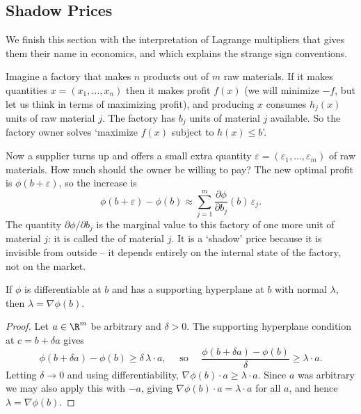 \subsection{Shadow Prices}

We finish this section with the interpretation of Lagrange multipliers that gives them their name in economics, and which explains the strange sign conventions.

Imagine a factory that makes $n$ products out of $m$ raw materials. If it makes quantities $x = (x_1, \dots, x_n)$ then it makes profit $f(x)$ (we will minimize $-f$, but let us think in terms of maximizing profit), and producing $x$ consumes $h_j(x)$ units of raw material $j$. The factory has $b_j$ units of material $j$ available. So the factory owner solves `maximize $f(x)$ subject to $h(x) \leq b$'.

Now a supplier turns up and offers a small extra quantity $\varepsilon = (\varepsilon_1, \dots, \varepsilon_m)$ of raw materials. How much should the owner be willing to pay? The new optimal profit is $\phi(b + \varepsilon)$, so the increase is
$$
\phi(b + \varepsilon) - \phi(b) \approx \sum_{j = 1}^m\frac{\partial\phi}{\partial b_j}(b)\,\varepsilon_j.
$$
The quantity $\partial\phi/\partial b_j$ is the marginal value to this factory of one more unit of material $j$: it is called the  of material $j$. It is a `shadow' price because it is invisible from outside -- it depends entirely on the internal state of the factory, not on the market.

\begin{theorem}
    If $\phi$ is differentiable at $b$ and has a supporting hyperplane at $b$ with normal $\lambda$, then $\lambda = \nabla\phi(b)$.
\end{theorem}
\begin{proof}
    Let $a \in \R^m$ be arbitrary and $\delta > 0$. The supporting hyperplane condition at $c = b + \delta a$ gives
    $$
    \phi(b + \delta a) - \phi(b) \geq \delta\, \lambda\cdot a, \quad\text{ so }\quad \frac{\phi(b + \delta a) - \phi(b)}{\delta} \geq \lambda\cdot a.
    $$
    Letting $\delta \rightarrow 0$ and using differentiability, $\nabla\phi(b)\cdot a \geq \lambda\cdot a$. Since $a$ was arbitrary we may also apply this with $-a$, giving $\nabla\phi(b)\cdot a = \lambda\cdot a$ for all $a$, and hence $\lambda = \nabla\phi(b)$.
\end{proof}

